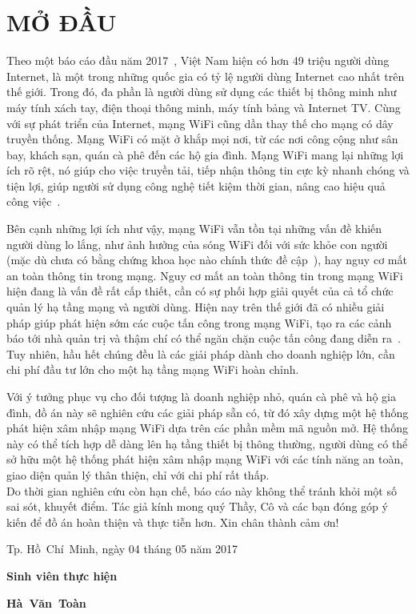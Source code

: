 \chapter*{MỞ ĐẦU}
Theo một báo cáo đầu năm 2017~\cite{kemp2017digital}, Việt Nam hiện có hơn 49 triệu người dùng Internet, là một trong những quốc gia có tỷ lệ người dùng Internet cao nhất trên thế giới. Trong đó, đa phần là người dùng sử dụng các thiết bị thông minh như máy tính xách tay, điện thoại thông minh, máy tính bảng và Internet TV. Cùng với sự phát triển của Internet, mạng WiFi cũng dần thay thế cho mạng có dây truyền thống. Mạng WiFi có mặt ở khắp mọi nơi, từ các nơi công cộng như sân bay, khách sạn, quán cà phê đến các hộ gia đình. Mạng WiFi mang lại những lợi ích rõ rệt, nó giúp cho việc truyền tải, tiếp nhận thông tin cực kỳ nhanh chóng và tiện lợi, giúp người sử dụng công nghệ tiết kiệm thời gian, nâng cao hiệu quả công việc~\cite{Khan2017}.

Bên cạnh những lợi ích như vậy, mạng WiFi vẫn tồn tại những vấn đề khiến người dùng lo lắng, như ảnh hưởng của sóng WiFi đối với sức khỏe con người (mặc dù chưa có bằng chứng khoa học nào chính thức đề cập~\cite{foster2013wi}), hay nguy cơ mất an toàn thông tin trong mạng. Nguy cơ mất an toàn thông tin trong mạng WiFi hiện đang là vấn đề rất cấp thiết, cần có sự phối hợp giải quyết của cả tổ chức quản lý hạ tầng mạng và người dùng. Hiện nay trên thế giới đã có nhiều giải pháp giúp phát hiện sớm các cuộc tấn công trong mạng WiFi, tạo ra các cảnh báo tới nhà quản trị và thậm chí có thể ngăn chặn cuộc tấn công đang diễn ra~\cite{karen2015comparing}. Tuy nhiên, hầu hết chúng đều là các giải pháp dành cho doanh nghiệp lớn, cần chi phí đầu tư lớn cho một hạ tầng mạng WiFi hoàn chỉnh.

Với ý tưởng phục vụ cho đối tượng là doanh nghiệp nhỏ, quán cà phê và hộ gia đình, đồ án này sẽ nghiên cứu các giải pháp sẵn có, từ đó xây dựng một hệ thống phát hiện xâm nhập mạng WiFi dựa trên các phần mềm mã nguồn mở. Hệ thống này có thể tích hợp dễ dàng lên hạ tầng thiết bị thông thường, người dùng có thể sở hữu một hệ thống phát hiện xâm nhập mạng WiFi với các tính năng an toàn, giao diện quản lý thân thiện, chỉ với chi phí rất thấp.\\

Do thời gian nghiên cứu còn hạn chế, báo cáo này không thể tránh khỏi một số sai sót, khuyết điểm. Tác giả kính mong quý Thầy, Cô và các bạn đóng góp ý kiến để đồ án hoàn thiện và thực tiễn hơn. Xin chân thành cảm ơn!

\begin{flushright}
    Tp. Hồ~Chí~Minh, ngày 04 tháng 05 năm 2017

    {\textbf{Sinh viên thực hiện}\hspace*{1.25cm}\par}
    \vspace*{1cm}
    \textbf{Hà~Văn~Toàn}\hspace*{2cm}
\end{flushright}
